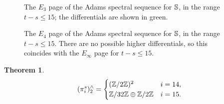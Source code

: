 \documentclass[11pt, titlepage]{article} %
\def\bb{\ensuremath\mathbb}
\def\inte{\ensuremath\mathbb{Z}}
\numberwithin{equation}{subsection}
\theoremstyle{plain}
\newtheorem{theorem}{Theorem}[subsection]
\theoremstyle{definition}
\begin{document}
\begin{figure}
\centering

\caption{The \(E_3\) page of the Adams spectral sequence for \(\bb{S}\), in the range \(t-s\leq 15\); the differentials are shown in green.}
\end{figure}

\begin{figure}[H]
\centering

\caption{The \(E_4\) page of the Adams spectral sequence for \(\bb{S}\), in the range \(t-s\leq 15\). There are no possible higher differentials, so this coincides with the \(E_\infty\) page for \(t-s\leq 15\).}
\end{figure}

\begin{theorem}
\[(\pi_i^s)^\wedge_2=\begin{cases}
(\inte/2\inte)^2 & i = 14,\\
\inte/32\inte \oplus \inte/2\inte & i = 15.
\end{cases}\]
\end{theorem}

\vfill \eject

%                                                                             
%                                                                             



\printbibliography
\end{document}
